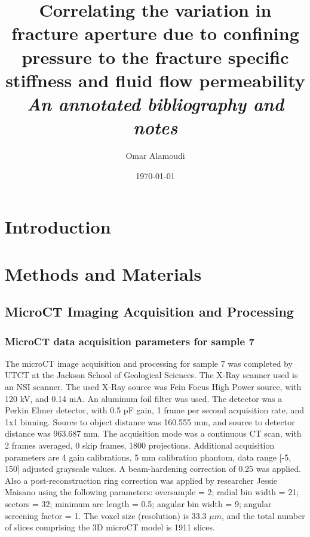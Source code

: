 \documentclass[12pt,titlepage]{article}
\title{Correlating the variation in fracture aperture due to confining pressure to the fracture specific stiffness and fluid flow permeability\\
\emph{An annotated bibliography and notes}}
\author{Omar Alamoudi}
\date{\today}
\begin{document}
\maketitle
\tableofcontents
\section{Introduction}
\section{Methods and Materials}
\subsection{MicroCT Imaging Acquisition and Processing}
\subsubsection{MicroCT data acquisition parameters for sample 7}
The microCT image acquisition and processing for sample 7  was completed by UTCT at the Jackson School of Geological Sciences. The X-Ray scanner used is an NSI scanner. The used X-Ray source was Fein Focus High Power source, with 120 kV, and 0.14 mA. An aluminum foil filter was used. The detector was a Perkin Elmer detector, with 0.5 pF gain, 1 frame per second acquisition rate, and 1x1 binning. Source to object distance was 160.555 mm, and source to detector distance was 963.687 mm. The acquisition mode was a continuous CT scan, with 2 frames averaged, 0 skip frames, 1800 projections. Additional acquisition parameters are 4 gain calibrations, 5 mm calibration phantom, data range [-5, 150] adjusted grayscale values. A beam-hardening correction of 0.25 was applied. Also a post-reconstruction ring correction was applied by researcher Jessie Maisano using the following parameters: oversample = 2; radial bin width = 21; sectors = 32; minimum arc length = 0.5; angular bin width = 9; angular screening factor = 1. The voxel size (resolution) is 33.3 $\mu m$, and the total number of slices comprising the 3D microCT model is 1911 slices. 
\end{document}
